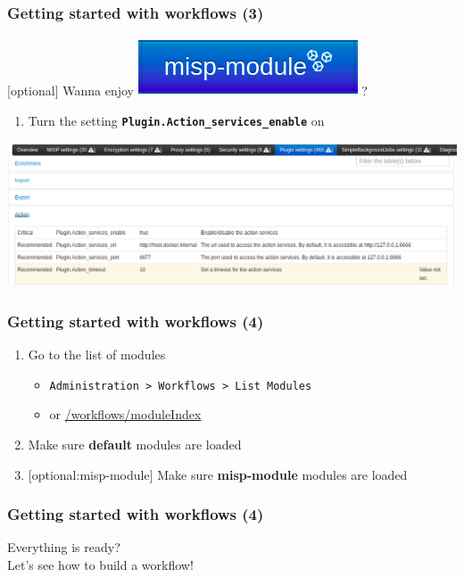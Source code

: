 \begin{frame}
    \frametitle{Getting started with workflows (3)}
    [optional] Wanna enjoy \includegraphics[width=0.17\linewidth]{pictures/misp-module-icon.png} ?
    \begin{enumerate}
        \item Turn the setting \texttt{\bf Plugin.Action\_services\_enable} on
    \end{enumerate}
    \begin{center}
        \includegraphics[width=1.0\textwidth]{pictures/settings-1.png}
    \end{center}
\end{frame}

\begin{frame}
    \frametitle{Getting started with workflows (4)}
    \begin{enumerate}
        \item Go to the list of modules
        \begin{itemize}
            \item \texttt{Administration > Workflows > List Modules}
            \item or \url{/workflows/moduleIndex}
        \end{itemize}
        \item Make sure \textbf{default} modules are loaded
        \item {[optional:misp-module]} Make sure \textbf{misp-module} modules are loaded
    \end{enumerate}
\end{frame}

\begin{frame}
    \frametitle{Getting started with workflows (4)}
    \centering
    {\Large Everything is ready?}\\
    \vspace*{3em}
    {\LARGE Let's see how to build a workflow!}
\end{frame}

